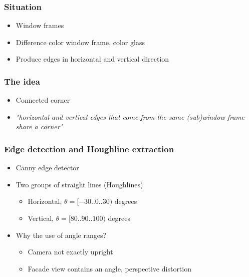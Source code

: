 \documentclass{beamer}
\begin{document}
\frame
{
	\frametitle{Situation}
	\begin{itemize}
	\item <+-| alert@+> Window frames 
	\item <+-| alert@+> Difference color window frame, color glass
	\item <+-| alert@+> Produce edges in horizontal and vertical direction
	\end{itemize}
}


\frame
{
	\frametitle{The idea}
	\begin{itemize}
	\item <+-| alert@+> Connected corner
	\item <+-| alert@+> \emph{"horizontal and vertical edges that come from the same (sub)window frame share
	a corner"}
	\end{itemize}
}


\frame
{
	\frametitle{Edge detection and Houghline extraction}
	\begin{itemize}
	\item <+-| alert@+> Canny edge detector
	\item <+-| alert@+> Two groups of straight lines (Houghlines)
	\begin{itemize}
		\item <+-| alert@+> Horizontal, $\theta = [-30..0..30)$ degrees
		\item <+-| alert@+> Vertical, $\theta = [80..90..100)$ degrees
	\end{itemize}
	\item <+-| alert@+> Why the use of angle ranges?
	\begin{itemize}
		\item <+-| alert@+> Camera not exactly upright
		\item <+-| alert@+> Facade view contains an angle, perspective distortion 
	\end{itemize}
	\end{itemize}

}
\end{document}
